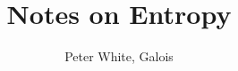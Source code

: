 \documentclass[11pt]{article}
\begin{document}




\title{Notes on Entropy}
\author{Peter White, Galois}



\thispagestyle{empty}









\end{document}
